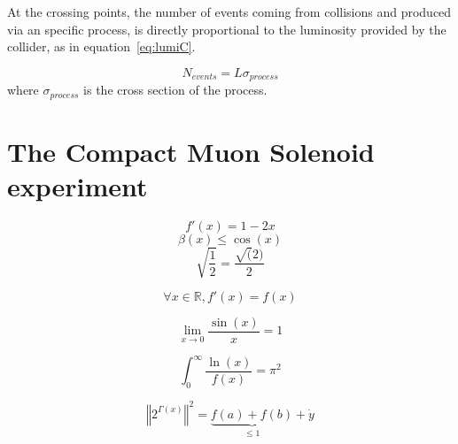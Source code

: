 At the crossing points, the number of events coming from collisions and produced via an specific process, is directly proportional to the luminosity provided by the collider, as in equation~\ref{eq:lumiC}.

\begin{equation}
  \label{eq:lumiN}
  N_{events}=L\sigma_{process}
\end{equation} where $\sigma_{process}$ is the cross section of the process. 

\section{The Compact Muon Solenoid experiment}
\label{sec:CMS}



\[ f'(x) = 1-2x \]
\[ \beta(x) \leq \cos(x) \]
\[ \sqrt{\frac{1}{2}}=\frac{\sqrt(2)}{2} \]

\begin{equation}
\forall x \in \mathbb{R}, f'(x)=f(x)
\end{equation}

\begin{equation}
\lim_{x\to 0}\frac{\sin(x)}{x}=1
\end{equation}

\begin{equation}
\int_{0}^{\infty}\frac{\ln(x)}{f(x)}=\pi^2
\end{equation}

\begin{equation*}
\left\Vert 2^{\Gamma(x)} \right\Vert^{2} = \underbrace{f(a)+f(b)}_{\leq 1}+\dot{y}
\end{equation*}


